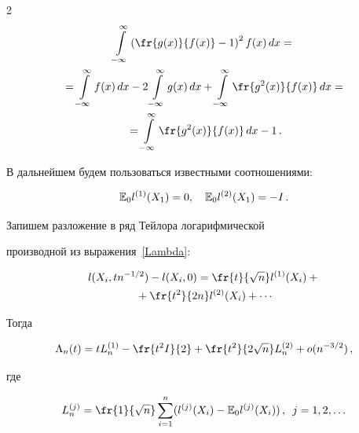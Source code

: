 \begin{multicols}{2}
\begin{multline}
\int\limits_{-\infty}^\infty\left(\fr{g(x)}{f(x)}-1\right)^2

f(x)\,dx={}\\

{}=\int\limits_{-\infty}^\infty

f(x)\,dx-2\int\limits_{-\infty}^\infty

g(x)\,dx+\int\limits_{-\infty}^\infty

\fr{g^2(x)}{f(x)}\,dx={}\\

{}=\int\limits_{-\infty}^\infty

\fr{g^2(x)}{f(x)}\,dx-1\,.

\end{multline}

В дальнейшем будем пользоваться известными соотношениями:

\begin{equation}

\label{Fisher} \E_0 l^{(1)}(X_1)=0,\quad\E_0 l^{(2)}(X_1)=-I\,.

\end{equation}

Запишем разложение в ряд Тейлора логарифмической

производной из выражения~\eqref{Lambda}:

\begin{multline*}

 l(X_i,tn^{-1/2})-l(X_i,0)=\fr

{t}{\sqrt{n}}l^{(1)}(X_i)+{}\\

{}+\fr{t^2}{2n}l^{(2)}(X_i)+\cdots

\end{multline*}

Тогда

\begin{equation}

\label{Lambda_expansion} 

\Lambda_n(t)=tL_n^{(1)}-\fr{t^2I}{2}+\fr {t^2}{2\sqrt{n}} L_n^{(2)}+o(n^{-3/2})\,,%

\end{equation}

где

\begin{equation*}

\label{Ln1}

L_n^{(j)}=\fr{1}{\sqrt{n}}\sum\limits_{i=1}^{n}(l^{(j)}(X_i)-\E_0

l^{(j)}(X_i))\,,\enskip j=1,2,\ldots


\end{equation*}
\end{multicols}
